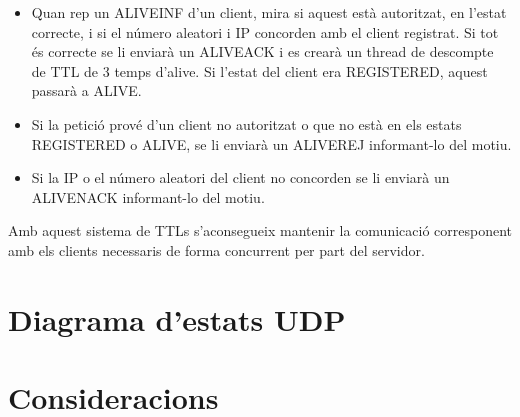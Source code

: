 \documentclass{article}
\begin{document}
\begin{itemize}

\item Quan rep un ALIVE\textunderscore INF d'un client, mira si aquest 
està autoritzat, en l'estat correcte, i si el número aleatori i IP 
concorden amb el client registrat. Si tot és correcte se li enviarà 
un ALIVE\textunderscore ACK i es crearà un thread de descompte de TTL 
de 3 temps d'alive. Si l'estat del client era REGISTERED, aquest
passarà a ALIVE.\\

\item Si la petició prové d'un client no autoritzat o que no està en els 
estats REGISTERED o ALIVE, se li enviarà un ALIVE\textunderscore REJ 
informant-lo del motiu.

\item Si la IP o el número aleatori del client no concorden se li enviarà
un ALIVE\textunderscore NACK informant-lo del motiu.
\end{itemize}
Amb aquest sistema de TTLs s'aconsegueix mantenir la comunicació corresponent
amb els clients necessaris de forma concurrent per part del servidor.



















\section{Diagrama d'estats UDP}
\section{Consideracions}
\end{document}
